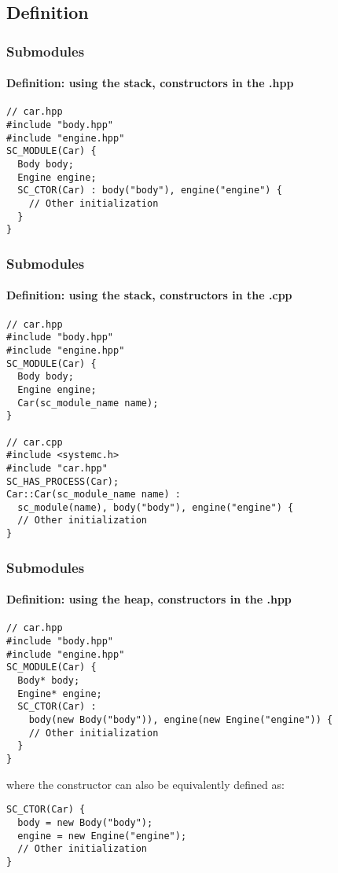 \subsection{Definition}

\begin{frame}[fragile]
\frametitle{Submodules}
\framesubtitle{Definition: using the stack, constructors in the .hpp}

{\scriptsize
\vspace{-0.5em}
\begin{verbatim}
// car.hpp
#include "body.hpp"
#include "engine.hpp"
SC_MODULE(Car) {
  Body body;
  Engine engine;
  SC_CTOR(Car) : body("body"), engine("engine") {
    // Other initialization
  }
}
\end{verbatim}
}
\end{frame}

\begin{frame}[fragile]
\frametitle{Submodules}
\framesubtitle{Definition: using the stack, constructors in the .cpp}

{\scriptsize
\vspace{-0.5em}
\begin{verbatim}
// car.hpp
#include "body.hpp"
#include "engine.hpp"
SC_MODULE(Car) {
  Body body;
  Engine engine;
  Car(sc_module_name name);
}

// car.cpp
#include <systemc.h>
#include "car.hpp"
SC_HAS_PROCESS(Car);
Car::Car(sc_module_name name) : 
  sc_module(name), body("body"), engine("engine") {
  // Other initialization
}
\end{verbatim}
}
\end{frame}

\begin{frame}[fragile]
\frametitle{Submodules}
\framesubtitle{Definition: using the heap, constructors in the .hpp}

{\scriptsize
\vspace{-0.5em}
\begin{verbatim}
// car.hpp
#include "body.hpp"
#include "engine.hpp"
SC_MODULE(Car) {
  Body* body;
  Engine* engine;
  SC_CTOR(Car) : 
    body(new Body("body")), engine(new Engine("engine")) {
    // Other initialization
  }
}
\end{verbatim}
where the constructor can also be equivalently defined as:
\begin{verbatim}
SC_CTOR(Car) {
  body = new Body("body");
  engine = new Engine("engine");
  // Other initialization
}
\end{verbatim}
}
\end{frame}

